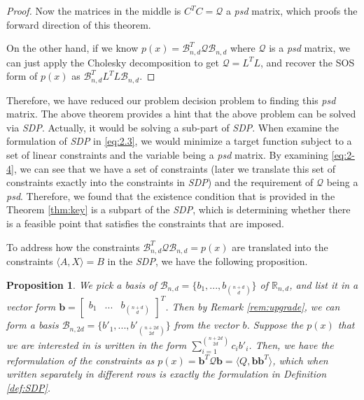 \documentclass[12pt]{amsart}
\numberwithin{equation}{section}
\newtheorem{prop}[thm]{Proposition}
\theoremstyle{definition}
\numberwithin{thm}{section}
\begin{document}
\begin{proof}
     Now the matrices in the middle is $C^T C = \mathcal{Q}$ a \emph{psd} matrix, which proofs the forward direction of this theorem.

     On the other hand, if we know $p(x) = \mathcal{B}_{n, d}^T \mathcal{Q} \mathcal{B}_{n, d}$ where $\mathcal{Q}$ is a \emph{psd} matrix, 
     we can just apply the Cholesky decomposition to get $\mathcal{Q} = L^T L$, and recover the SOS form of $p(x)$ as
     $\mathcal{B}_{n, d}^T L^T L \mathcal{B}_{n, d}$. 
\end{proof}

\smallskip
Therefore, we have reduced our problem decision problem to finding this \emph{psd} matrix. 
The above theorem provides a hint that the above problem can be solved via \emph{SDP}. Actually, it would be solving a sub-part of \emph{SDP}.
When examine the formulation of \emph{SDP} in \eqref{eq:2.3}, we would minimize a target function subject to a set of linear constraints and the variable being a \emph{psd} matrix. 
By examining \eqref{eq:2-4}, we can see that we have a set of constraints (later we translate this set of constraints exactly into the constraints in \emph{SDP}) 
and the requirement of $\mathcal{Q}$ being a \emph{psd}.
Therefore, we found that the existence condition that is provided in the Theorem \ref{thm:key} is a subpart of the \emph{SDP}, 
which is determining whether there is a feasible point that satisfies the constraints that are imposed. 

To address how the constraints $\mathcal{B}_{n, d} ^ T \mathcal{Q} \mathcal{B}_{n, d} = p(x)$ are translated into the constraints $\langle A, X \rangle = B$ in the \emph{SDP}, we have the following proposition.

\begin{prop}
     \label{prop:2.19}
     We pick a basis of $\mathcal{B}_{n, d} = \{b_1, ..., b_{n + d \choose d}\}$ of $\mathbb{R}_{n, d}$, and list it in a vector form $ \mathbf{b} =\begin{bmatrix}
          b_1 &
          ... &
          b_{ n+ d \choose d}
     \end{bmatrix} ^ T$. Then by Remark \ref{rem:upgrade}, we can form a basis $\mathcal{B}_{n, 2d} = \{b'_1, ..., b'_{n + 2d \choose 2d}\}$ from the vector $b$. 
     Suppose the $p(x)$ that we are interested in is written in the form $\sum_{i = 1}^{n + 2d \choose 2d } c_i b'_i$.
     Then, we have the reformulation of the constraints as $p(x) = \mathbf{b}^T \mathcal{Q} \mathbf{b} = \langle Q, \mathbf{bb}^T \rangle$, 
     which when written separately in different rows is exactly the formulation in Definition \ref{def:SDP}.
\end{prop}
\end{document}

